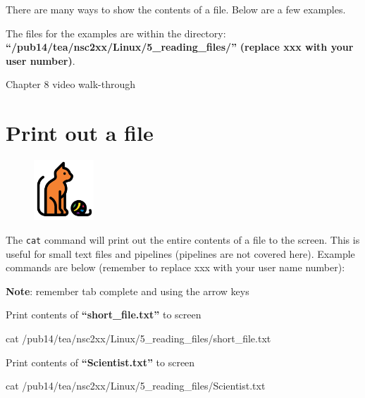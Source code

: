 \documentclass[
  letterpaper,
  DIV=11,
  numbers=noendperiod]{scrreprt}
\newenvironment{Shaded}{\begin{snugshade}}{\end{snugshade}}
\newcommand{\FunctionTok}[1]{\textcolor[rgb]{0.28,0.35,0.67}{#1}}
\newcommand{\NormalTok}[1]{\textcolor[rgb]{0.00,0.23,0.31}{#1}}
\begin{document}
There are many ways to show the contents of a file. Below are a few
examples.

The files for the examples are within the directory:
\textbf{``/pub14/tea/nsc2xx/Linux/5\_reading\_files/''} \textbf{(replace
xxx with your user number)}.

Chapter 8 video walk-through

\hypertarget{print-out-a-file}{%
\section{Print out a file}\label{print-out-a-file}}

\begin{figure}

{\centering \includegraphics[width=0.2\textwidth,height=\textheight]{figures/cat.png}

}

\end{figure}

The \texttt{cat} command will print out the entire contents of a file to
the screen. This is useful for small text files and pipelines (pipelines
are not covered here). Example commands are below (remember to replace
xxx with your user name number):

\textbf{Note}: remember tab complete and using the arrow keys

Print contents of \textbf{``short\_file.txt''} to screen

\begin{Shaded}
\begin{Highlighting}[]
\FunctionTok{cat}\NormalTok{ /pub14/tea/nsc2xx/Linux/5\_reading\_files/short\_file.txt}
\end{Highlighting}
\end{Shaded}

Print contents of \textbf{``Scientist.txt''} to screen

\begin{Shaded}
\begin{Highlighting}[]
\FunctionTok{cat}\NormalTok{ /pub14/tea/nsc2xx/Linux/5\_reading\_files/Scientist.txt}
\end{Highlighting}
\end{Shaded}
\end{document}
